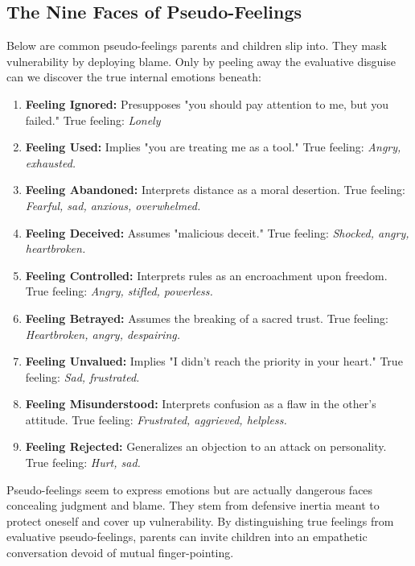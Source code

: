 \subsection{The Nine Faces of Pseudo-Feelings}
Below are common pseudo-feelings parents and children slip into. 
They mask vulnerability by deploying blame. 
Only by peeling away the evaluative disguise can we discover the true internal emotions beneath:

\begin{enumerate}
    \item \textbf{Feeling Ignored:} Presupposes "you should pay attention to me, but you failed." True feeling: \textit{Lonely}
    \item \textbf{Feeling Used:} Implies "you are treating me as a tool." True feeling: \textit{Angry, exhausted.}
    \item \textbf{Feeling Abandoned:} Interprets distance as a moral desertion. True feeling: \textit{Fearful, sad, anxious, overwhelmed.}
    \item \textbf{Feeling Deceived:} Assumes "malicious deceit." True feeling: \textit{Shocked, angry, heartbroken.}
    \item \textbf{Feeling Controlled:} Interprets rules as an encroachment upon freedom. 
    True feeling: \textit{Angry, stifled, powerless.}
    \item \textbf{Feeling Betrayed:} Assumes the breaking of a sacred trust. 
    True feeling: \textit{Heartbroken, angry, despairing.}
    \item \textbf{Feeling Unvalued:} Implies "I didn't reach the priority in your heart." True feeling: \textit{Sad, frustrated.}
    \item \textbf{Feeling Misunderstood:} Interprets confusion as a flaw in the other's attitude. 
    True feeling: \textit{Frustrated, aggrieved, helpless.}
    \item \textbf{Feeling Rejected:} Generalizes an objection to an attack on personality. 
    True feeling: \textit{Hurt, sad.}
\end{enumerate}

\begin{keyinsight}
Pseudo-feelings seem to express emotions but are actually dangerous faces concealing judgment and blame. 
They stem from defensive inertia meant to protect oneself and cover up vulnerability.
By distinguishing true feelings from evaluative pseudo-feelings, parents can invite children into an empathetic conversation devoid of mutual finger-pointing.
\end{keyinsight}

